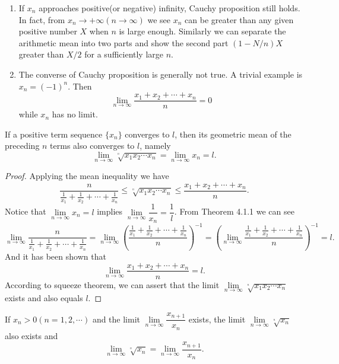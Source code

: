 \documentclass[11pt,fleqn]{book} %
\begin{document}
\begin{remark}
    \begin{enumerate}
    \item
	If $x_n$ approaches positive(or negative) infinity, Cauchy proposition still holds. In fact, from $x_n\to+\infty(n\to\infty)$ we see $x_n$ can be greater than any given positive number $X$ when $n$ is large enough. Similarly we can separate the arithmetic mean into two parts and show the second part $(1-N/n)X$ greater than $X/2$ for a sufficiently large $n$.\\
	\item
	The converse of Cauchy proposition is generally not true. A trivial example is $x_n=(-1)^n$. Then
	\[
	\lim\limits_{n\to\infty}\frac{x_1+x_2+\cdots+x_n}{n}=0
	\]
	while $x_n$ has no limit.
    \end{enumerate}
\end{remark}
\vspace{3mm}
\begin{corollary}
	If a positive term sequence $\{x_n\}$ converges to $l$, then its geometric mean of the preceding $n$ terms also converges to $l$, namely
	\begin{equation}
	\lim\limits_{n\to\infty}\sqrt[^n]{x_1x_2\cdots x_n}=\lim\limits_{n\to\infty}x_n=l.
	\end{equation}
\end{corollary}

\begin{proof}
	Applying the mean inequality we have
    \[
    \frac{n}{\frac{1}{x_1}+\frac{1}{x_2}+\cdots+\frac{1}{x_n}}\leqslant\sqrt[^n]{x_1x_2\cdots x_n}\leqslant\frac{x_1+x_2+\cdots+x_n}{n}.
    \]
    Notice that $\lim\limits_{n\to\infty}x_n=l$ implies $\lim\limits_{n\to\infty}\dfrac{1}{x_n}=\dfrac{1}{l}$. From Theorem 4.1.1 we can see
    \[
    \lim\limits_{n\to\infty}\frac{n}{\frac{1}{x_1}+\frac{1}{x_2}+\cdots+\frac{1}{x_n}}=\lim\limits_{n\to\infty}\left(\frac{\frac{1}{x_1}+\frac{1}{x_2}+\cdots+\frac{1}{x_n}}{n}\right)^{-1}=\left(\lim\limits_{n\to\infty}\frac{\frac{1}{x_1}+\frac{1}{x_2}+\cdots+\frac{1}{x_n}}{n}\right)^{-1}=l.
    \]
    And it has been shown that
    \[
    \lim\limits_{n\to\infty}\frac{x_1+x_2+\cdots+x_n}{n}=l.
    \]
    According to squeeze theorem, we can assert that the limit $\lim\limits_{n\to\infty}\sqrt[^n]{x_1x_2\cdots x_n}$ exists and also equals $l$.   
\end{proof}

\vspace{3mm}

\begin{proposition}
	If $x_n>0(n=1,2,\cdots)$ and the limit $\lim\limits_{n\to\infty}\dfrac{x_{n+1}}{x_n}$ exists, the limit $\lim\limits_{n\to\infty}\sqrt[^n]{x_n}$ also exists and
	\[
	\lim\limits_{n\to\infty}\sqrt[^n]{x_n}=\lim\limits_{n\to\infty}\frac{x_{n+1}}{x_n}.
	\]
\end{proposition}
\end{document}
